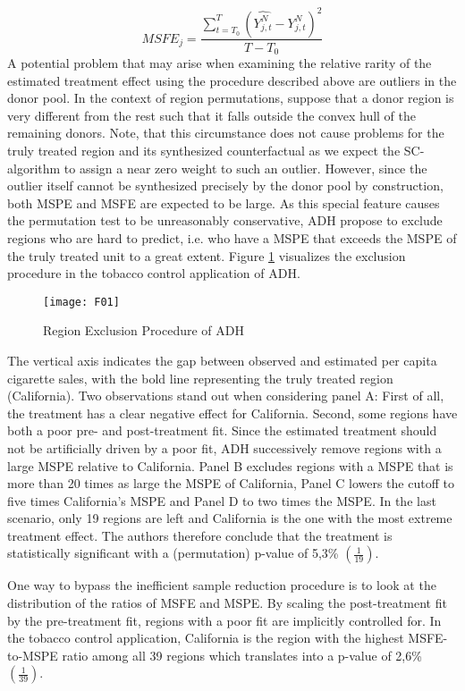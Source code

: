 \[
MSFE_j = \frac{\sum_{t = T_0}^{T} \left(\widehat{Y_{j,t}^N} - Y_{j,t}^N\right) ^2}{T- T_0}
\]
A potential problem that may arise when examining the relative rarity of the estimated treatment effect using the procedure described above are outliers in the donor pool. In the context of region permutations, suppose that a donor region is very different from the rest such that it falls outside the convex hull of the remaining donors. Note, that this circumstance does not cause problems for the truly treated region and its synthesized counterfactual as we expect the \ac{SC}-algorithm to assign a near zero weight to such an outlier. However, since the outlier itself cannot be synthesized precisely by the donor pool by construction, both \ac{MSPE} and \ac{MSFE} are expected to be large. As this special feature causes the permutation test to be unreasonably conservative, \ac{ADH} propose to exclude regions who are hard to predict, i.e. who have a \ac{MSPE} that exceeds the \ac{MSPE} of the truly treated unit to a great extent. Figure \ref{F_01} visualizes the exclusion procedure in the tobacco control application of \ac{ADH}. 

\begin{figure}[H]
	\centering
	\texttt{[image: F01]}
	\caption{Region Exclusion Procedure of ADH}
	\label{F_01}
\end{figure}

The vertical axis indicates the gap between observed and estimated  per capita cigarette sales, with the bold line representing the truly treated region (California). Two observations stand out when considering panel A: First of all, the treatment has a clear negative effect for California. Second, some regions have both a poor pre- and post-treatment fit. Since the estimated treatment should not be artificially driven by a poor fit, \ac{ADH} successively remove regions with a large \ac{MSPE} relative to California. Panel B excludes regions with a \ac{MSPE} that is more than 20 times as large the \ac{MSPE} of California, Panel C lowers the cutoff to five times California's \ac{MSPE} and Panel D to  two times the \ac{MSPE}. In the last scenario, only 19 regions are left and California is the one with the most extreme treatment effect. The authors therefore conclude that the treatment is statistically significant with a (permutation) p-value of 5,3\% $\left(  \frac{1}{19} \right) $. 

One way to bypass the inefficient sample reduction procedure is to look at the distribution of the ratios of \ac{MSFE} and \ac{MSPE}. By scaling the post-treatment fit by the pre-treatment fit, regions with a poor fit are implicitly controlled for. In the tobacco control application, California is the region with the highest \ac{MSFE}-to-\ac{MSPE} ratio among all 39 regions which translates into a p-value of 2,6\% $\left(  \frac{1}{39} \right) $. 

